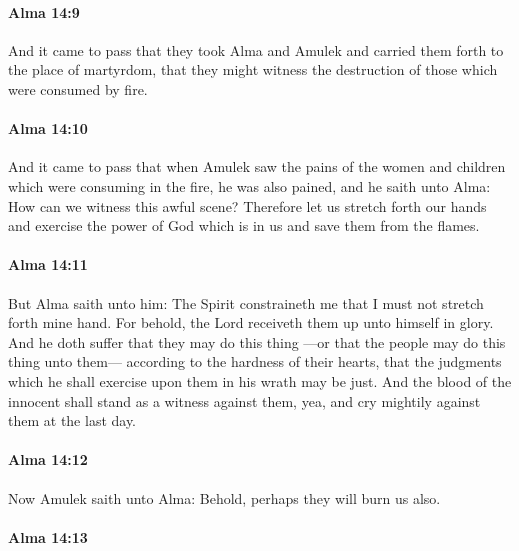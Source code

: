 		\paragraph{Alma 14:9} %
			\label{ALMA-14-9}

			And it came to pass that they took Alma and Amulek
			and carried them forth to the place of martyrdom,
			that they might witness the destruction of those which were consumed by fire.

		\paragraph{Alma 14:10} %
			\label{ALMA-14-10}

			And it came to pass that
			when Amulek saw the pains of the women and children
			which were consuming in the fire,
			he was also pained,
			and he saith unto Alma:
			How can we witness this awful scene?
			Therefore let us stretch forth our hands
			and exercise the power of God which is in us
			and save them from the flames.

		\paragraph{Alma 14:11} %
			\label{ALMA-14-11}

			But Alma saith unto him:
			The Spirit constraineth me that I must not stretch forth mine hand.
			For behold, the Lord receiveth them up unto himself in glory.
			And he doth suffer that they may do this thing
			---or that the people may do this thing unto them---
			according to the hardness of their hearts,
			that the judgments which he shall exercise upon them in his wrath may be just.
			And the blood of the innocent shall stand as a witness against them,
			yea, and cry mightily against them at the last day.

		\paragraph{Alma 14:12} %
			\label{ALMA-14-12}

			Now Amulek saith unto Alma:
			Behold, perhaps they will burn us also.

		\paragraph{Alma 14:13} %
			\label{ALMA-14-13}

